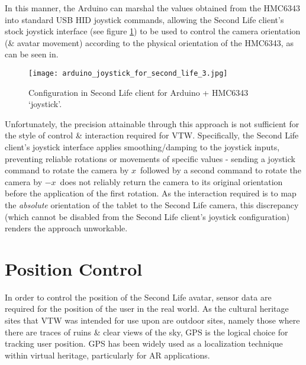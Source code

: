 
In this manner, the Arduino can marshal the values obtained from the HMC6343 into standard USB HID joystick commands, allowing the Second Life client's stock joystick interface (see figure \ref{arduino_joystick_for_second_life_3.jpg}) to be used to control the camera orientation (\& avatar movement) according to the physical orientation of the HMC6343, as can be seen in\ArduinoJoystickVideoFootnote{}.

\begin{figure}[h]
\centering
  \texttt{[image: arduino\_joystick\_for\_second\_life\_3.jpg]}
  \caption{Configuration in Second Life client for Arduino + HMC6343 `joystick'.}
  \label{arduino_joystick_for_second_life_3.jpg}
\end{figure}

Unfortunately, the precision attainable through this approach is not sufficient for the style of control \& interaction required for VTW. Specifically, the Second Life client's joystick interface applies smoothing/damping to the joystick inputs, preventing reliable rotations or movements of specific values - sending a joystick command to rotate the camera by $x$\textdegree\ followed by a second command to rotate the camera by $-x$\textdegree\ does not reliably return the camera to its original orientation before the application of the first rotation. As the interaction required is to map the \textit{absolute} orientation of the tablet to the Second Life camera, this discrepancy (which cannot be disabled from the Second Life client's joystick configuration) renders the approach unworkable.


\section{Position Control}
In order to control the position of the Second Life avatar, sensor data are required for the position of the user in the real world. As the cultural heritage sites that VTW was intended for use upon are outdoor sites, namely those where there are traces of ruins \& clear views of the sky, GPS is the logical choice for tracking user position. GPS has been widely used as a localization technique within virtual heritage, particularly for AR applications.


